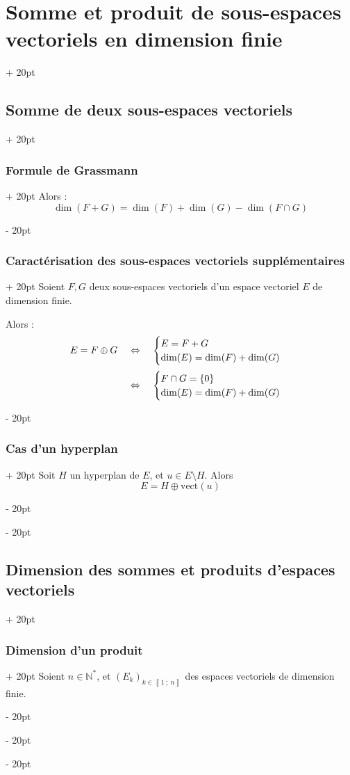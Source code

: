 \documentclass[a4paper, 12pt, twoside]{article}
\newcommand{\N}{\mathbb{N}} %
\newcommand{\nset}[2]{\left\llbracket #1\ ;\ #2 \right\rrbracket}
\newcommand{\set}[1]{\left\{ #1 \right\}}
\newcommand{\ssi}{\ \Leftrightarrow \ }
\newcommand{\eqsys}[2]{\begin{cases} #1 \\ #2 \end{cases}}
\newcommand{\ind}[1][20pt]{\advance\leftskip + #1}
\newcommand{\deind}[1][20pt]{\advance\leftskip - #1}
\newenvironment{indt}[2][20pt]{#2 \par \ind[#1]}{\par \deind} %
\begin{document}
\begin{indt}{\section{Somme et produit de sous-espaces vectoriels en dimension finie}}
\begin{indt}{\subsection{Somme de deux sous-espaces vectoriels}}
\begin{indt}{\subsubsection{Formule de Grassmann}}
                Alors :
                    \[ \dim(F + G) = \dim(F) + \dim(G) - \dim(F \cap G) \]
            \end{indt}
            
            \vspace{12pt}
            
            \begin{indt}{\subsubsection{Caractérisation des sous-espaces vectoriels supplémentaires}}
                Soient $F, G$ deux sous-espaces vectoriels d'un espace vectoriel $E$ de dimension finie.
                
                Alors :
                    \[
                        \begin{array}{rcl}
                            E = F \oplus G
                            &\ssi& \eqsys{E = F + G}{\dim(E) = \dim(F) + \dim(G)}
                            \vspace{6pt}
                            \\
                            &\ssi& \eqsys{F \cap G = \set 0}{\dim(E) = \dim(F) + \dim(G)}
                        \end{array}
                    \]
            \end{indt}
            
            \vspace{12pt}
            
            \begin{indt}{\subsubsection{Cas d'un hyperplan}}
                Soit $H$ un hyperplan de $E$, et $u \in E \setminus H$. Alors
                    \[ E = H \oplus \mathrm{vect}(u) \]
            \end{indt}
        \end{indt}
        
        \vspace{12pt}
        
        \begin{indt}{\subsection{Dimension des sommes et produits d'espaces vectoriels}}
            \begin{indt}{\subsubsection{Dimension d'un produit}}
                Soient $n \in \N^*$, et $(E_k)_{k \in \nset 1 n}$ des espaces vectoriels de dimension finie.
                

\end{indt}
\end{indt}
\end{indt}
\end{document}
